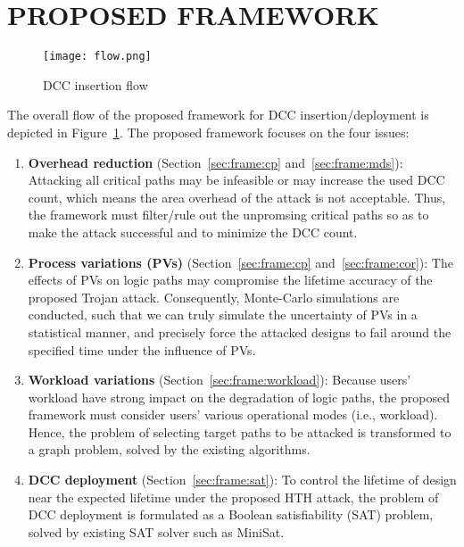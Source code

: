 \section{PROPOSED FRAMEWORK}
\label{sec:frame}
\begin{figure}
	\centering
	\texttt{[image: flow.png]}
	\caption{DCC insertion flow}
	\label{fig:flow}
\end{figure}
The overall flow of the proposed framework for DCC insertion/deployment is depicted in Figure~\ref{fig:flow}. The proposed framework focuses on the four issues: 
\begin{enumerate}[leftmargin=*]%
	\item \textbf{Overhead reduction} (Section~\ref{sec:frame:cp} and~\ref{sec:frame:mds}): Attacking all critical paths may be infeasible or may increase the used DCC count, which means the area overhead of the attack is not acceptable. Thus, the framework must filter/rule out the unpromsing critical paths so as to make the attack successful and to minimize the DCC count. 
	\item \textbf{Process variations (PVs)} (Section~\ref{sec:frame:cp} and~\ref{sec:frame:cor}): The effects of PVs on logic paths may compromise the lifetime accuracy of the proposed Trojan attack. Consequently, Monte-Carlo simulations are conducted, such that we can truly simulate the uncertainty of PVs in a statistical manner, and precisely force the attacked designs to fail around the specified time under the influence of PVs.  
	\item \textbf{Workload variations} (Section~\ref{sec:frame:workload}): Because users' workload have strong impact on the degradation of logic paths, the proposed framework must consider users' various operational modes (i.e., workload). Hence, the problem of selecting target paths to be attacked is transformed to a graph problem, solved by the existing algorithms. 
	\item \textbf{DCC deployment} (Section~\ref{sec:frame:sat}): To control the lifetime of design near the expected lifetime under the proposed HTH attack, the problem of DCC deployment is formulated as a Boolean satisfiability (SAT) problem, solved by existing SAT solver such as MiniSat.
\end{enumerate}



